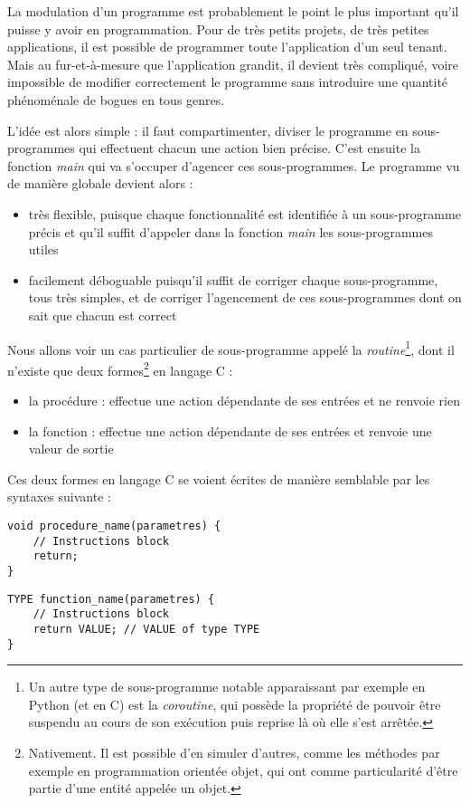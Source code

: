 \documentclass[../../../main.tex]{subfiles}
\begin{document}
La modulation d'un programme est probablement le point le plus important qu'il puisse y avoir en programmation. Pour de très petits projets, de très petites applications, il est possible de programmer toute l'application d'un seul tenant. Mais au fur-et-à-mesure que l'application grandit, il devient très compliqué, voire impossible de modifier correctement le programme sans introduire une quantité phénoménale de bogues en tous genres.
 
L'idée est alors simple : il faut compartimenter, diviser le programme en sous-programmes qui effectuent chacun une action bien précise. C'est ensuite la fonction \textit{main} qui va s'occuper d'agencer ces sous-programmes. Le programme vu de manière globale devient alors :
\begin{itemize}
	\item très flexible, puisque chaque fonctionnalité est identifiée à un sous-programme précis et qu'il suffit d'appeler dans la fonction \textit{main} les sous-programmes utiles
	\item facilement déboguable puisqu'il suffit de corriger chaque sous-programme, tous très simples, et de corriger l'agencement de ces sous-programmes dont on sait que chacun est correct
\end{itemize}
Nous allons voir un cas particulier de sous-programme appelé la \textit{routine}\footnote{Un autre type de sous-programme notable apparaissant par exemple en Python 	(et en C) est la \textit{coroutine}, qui possède la propriété de pouvoir être suspendu au cours de son exécution puis reprise là où elle s'est arrêtée.}, dont il n'existe que deux formes\footnote{Nativement. Il est possible d'en simuler d'autres, comme les méthodes par exemple en programmation orientée objet, qui ont comme particularité d'être partie d'une entité appelée un objet.} en langage C :
\begin{itemize}
	\item la procédure : effectue une action dépendante de ses entrées et ne renvoie rien
	\item la fonction : effectue une action dépendante de ses entrées et renvoie une valeur de sortie
\end{itemize}
Ces deux formes en langage C se voient écrites de manière semblable par les syntaxes suivante :

\begin{minipage}{0.5\textwidth}
\begin{verbatim}
void procedure_name(parametres) {
	// Instructions block
	return;
}
\end{verbatim}
\end{minipage}
\begin{minipage}{0.5\textwidth}
\begin{verbatim}
TYPE function_name(parametres) {
	// Instructions block
	return VALUE; // VALUE of type TYPE
}
\end{verbatim}
\end{minipage}
 
\end{document}
